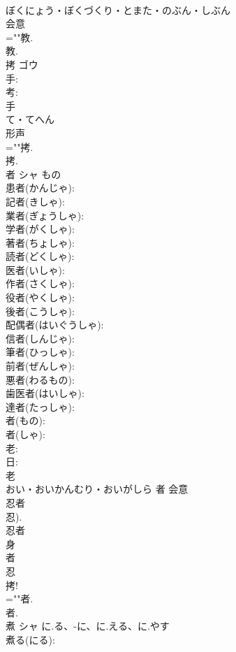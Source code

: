 \documentclass[8pt]{extreport}
\begin{document}
\begin{CJK}{UTF8}{min}
\\	ぼくにょう・ぼくづくり・とまた・のぶん・しぶん	
\\	会意 
\\	=""教.
\\	教.
\\	拷	ゴウ			
\\	手: 
\\	考: 
\\	手	
\\	て・てへん	
\\	形声 
\\	=""拷.
\\	拷.
\\	者	シャ	もの		
\\	患者(かんじゃ): 
\\	記者(きしゃ): 
\\	業者(ぎょうしゃ): 
\\	学者(がくしゃ): 
\\	著者(ちょしゃ): 
\\	読者(どくしゃ): 
\\	医者(いしゃ): 
\\	作者(さくしゃ): 
\\	役者(やくしゃ): 
\\	後者(こうしゃ): 
\\	配偶者(はいぐうしゃ): 
\\	信者(しんじゃ): 
\\	筆者(ひっしゃ): 
\\	前者(ぜんしゃ): 
\\	悪者(わるもの): 
\\	歯医者(はいしゃ): 
\\	達者(たっしゃ): 
\\	者(もの): 
\\	者(しゃ): 
\\	老: 
\\	日: 
\\	老	
\\	おい・おいかんむり・おいがしら	者	会意 
\\	忍者 
\\	忍). 
\\	忍者 
\\	身 
\\	者 
\\	忍 
\\	拷!	
\\	=""者.
\\	者.
\\	煮	シャ	に.る、-に、に.える、に.やす		
\\	煮る(にる): 

\end{CJK}
\end{document}
